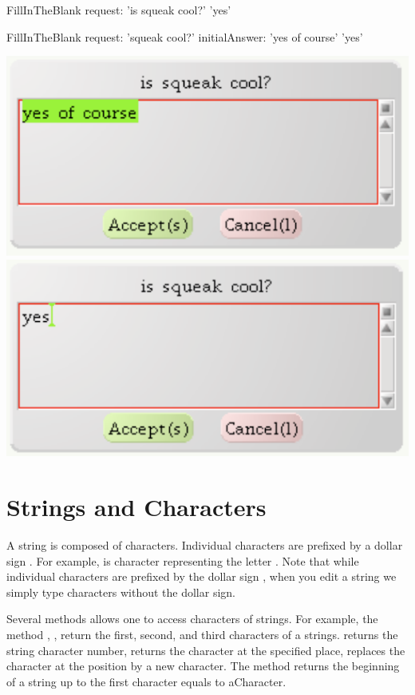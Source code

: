 \begin{minipage}[c]{0.5\linewidth}
\begin{nalltt}
FillInTheBlank request: 'is squeak cool?'  
\pr 'yes'

FillInTheBlank request: 'squeak cool?' initialAnswer: 'yes of course'
\pr 'yes'
\end{nalltt}
\end{minipage}
\begin{minipage}[c]{0.5\linewidth}
\includegraphics[width=.8\linewidth]{FillInTheBlank}
\includegraphics[width=.8\linewidth]{FillIn2}
\end{minipage}




\section{Strings and Characters}

A string is composed of characters. Individual characters are prefixed by a dollar sign \ct{\$}. For example,  is character representing the letter .
Note that while individual characters are prefixed by the dollar sign \ct{\$}, when you edit a string we simply type characters without the dollar sign. 

Several methods allows one to access characters of strings. For example, the method , ,  return the first, second, and third characters of a strings.  returns the string character number,  returns the character at the specified place,  replaces the character at the position by a new character. The method  returns the beginning of a string up to the first character equals to aCharacter.


